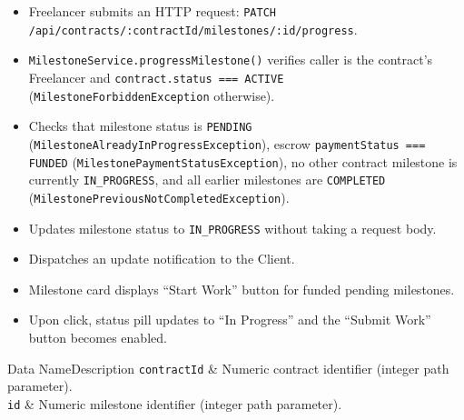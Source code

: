 \begin{itemize}[leftmargin=1.6em,topsep=3pt,itemsep=2pt,parsep=0pt,label=$\bullet$]
      \item Freelancer submits an HTTP request: \texttt{PATCH /\allowbreak{}api/\allowbreak{}contracts/\allowbreak{}:\allowbreak{}contractId/\allowbreak{}milestones/\allowbreak{}:\allowbreak{}id/\allowbreak{}progress}.
      \item \texttt{Milestone\allowbreak{}Service.\allowbreak{}progress\allowbreak{}Milestone()} verifies caller is the contract's Freelancer and \texttt{contract.status === ACTIVE} (\texttt{MilestoneForbiddenException} otherwise).
      \item Checks that milestone status is \texttt{PENDING} (\texttt{MilestoneAlreadyInProgressException}), escrow \texttt{paymentStatus === FUNDED} (\texttt{MilestonePaymentStatusException}), no other contract milestone is currently \texttt{IN\_PROGRESS}, and all earlier milestones are \texttt{COMPLETED} (\texttt{MilestonePreviousNotCompletedException}).
      \item Updates milestone status to \texttt{IN\_PROGRESS} without taking a request body.
      \item Dispatches an update notification to the Client.
\end{itemize}

\begin{itemize}[leftmargin=1.6em,topsep=3pt,itemsep=2pt,parsep=0pt,label=$\bullet$]
      \item Milestone card displays ``Start Work'' button for funded pending milestones.
      \item Upon click, status pill updates to ``In Progress'' and the ``Submit Work'' button becomes enabled.
\end{itemize}


\begin{specdatatable}{Data Name}{Description}
      \texttt{contractId} & Numeric contract identifier (integer path parameter).\\ \hline
      \texttt{id} & Numeric milestone identifier (integer path parameter).\\ \hline
\end{specdatatable}

